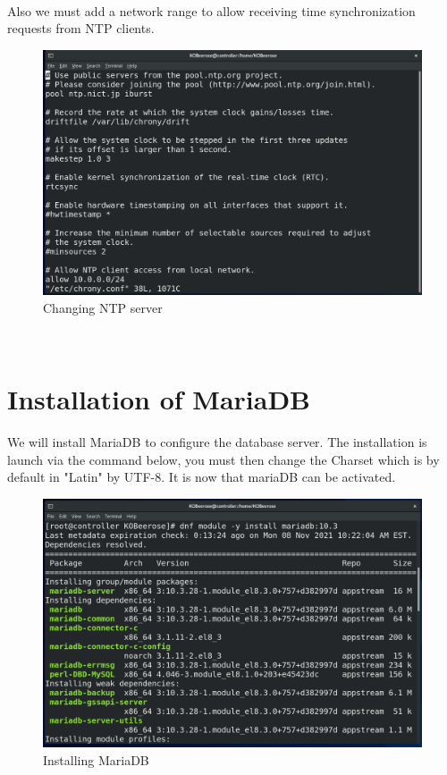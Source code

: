 \begin{spacing}{1.2}
\\
\par Also we must add a network range to allow receiving time synchronization requests from NTP clients.
\\
\begin{figure}[!htb] 
\begin{center} 
\includegraphics[width=1\linewidth]{Cloud/Config/Changing NTP server} 
\end{center} 
\caption{Changing NTP server} 
\end{figure}  \FloatBarrier
\\


\section{Installation of MariaDB}

\par We will install MariaDB to configure the database server. The installation is launch via the command below, you must then change the Charset which is by default in "Latin" by UTF-8. It is now that mariaDB can be activated.\\

\begin{figure}[!htb] 
\begin{center} 
\includegraphics[width=1\linewidth]{Cloud/Config/Installing MariaDB} 
\end{center} 
\caption{Installing MariaDB} 
\end{figure}  \FloatBarrier
\\


\end{spacing}
